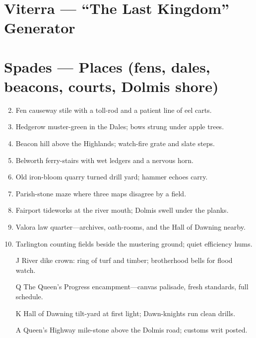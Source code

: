 \section{Viterra --- ``The Last Kingdom'' Generator}
\label{chap:viterra}

\section*{Spades --- Places (fens, dales, beacons, courts, Dolmis shore)}
\label{sec:viterra-places}
\begin{enumerate}
\setcounter{enumi}{1}
\item Fen causeway stile with a toll-rod and a patient line of eel carts.
\item Hedgerow muster-green in the Dales; bows strung under apple trees.
\item Beacon hill above the Highlands; watch-fire grate and slate steps.
\item Belworth ferry-stairs with wet ledgers and a nervous horn.
\item Old iron-bloom quarry turned drill yard; hammer echoes carry.
\item Parish-stone maze where three maps disagree by a field.
\item Fairport tideworks at the river mouth; Dolmis swell under the planks.
\item Valora law quarter---archives, oath-rooms, and the Hall of Dawning nearby.
\item Tarlington counting fields beside the mustering ground; quiet efficiency hums.
\item[J] River dike crown: ring of turf and timber; brotherhood bells for flood watch.
\item[Q] The Queen's Progress encampment---canvas palisade, fresh standards, full schedule.
\item[K] Hall of Dawning tilt-yard at first light; Dawn-knights run clean drills.
\item[A] Queen's Highway mile-stone above the Dolmis road; customs writ posted.
\end{enumerate}

